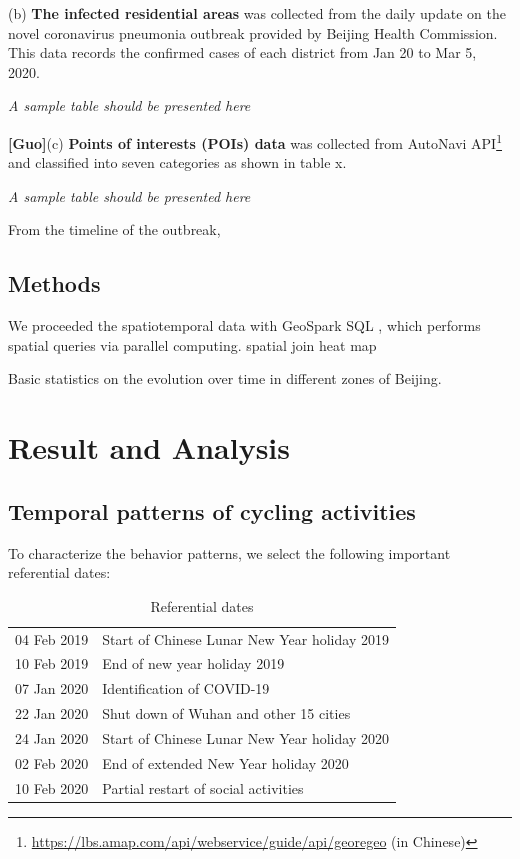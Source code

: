 \documentclass[preprints,ijgi,submit,moreauthors]{Definitions/mdpi}
\begin{document}
(b) \textbf{The infected residential areas} was collected from the daily update on the novel coronavirus pneumonia outbreak provided by Beijing Health Commission. 
This data records the confirmed cases of each district from Jan 20 to Mar 5, 2020. 

{\centering\textit{A sample table should be presented here}

}

\textbf{[Guo]}(c) \textbf{Points of interests (POIs) data} was collected from AutoNavi API\footnote{\url{https://lbs.amap.com/api/webservice/guide/api/georegeo} (in Chinese)} and classified into seven categories as shown in table x. 

{\centering\textit{A sample table should be presented here}

}

From the timeline \cite{li2020early} of the outbreak, 

\subsection{Methods}
We proceeded the spatiotemporal data with GeoSpark SQL \cite{huang2017geospark}, which performs spatial queries via parallel computing.
spatial join 
heat map

Basic statistics on the evolution over time in different zones of Beijing. 

\section{Result and Analysis}
\subsection{Temporal patterns of cycling activities}
To characterize the behavior patterns, we select the following important referential dates: 

\begin{table}[H]
    \centering
    \begin{tabular}{ll}
    04 Feb 2019 & Start of Chinese Lunar New Year holiday 2019 \\
    10 Feb 2019 & End of new year holiday 2019\\
    07 Jan 2020 & Identification of COVID-19\\
    22 Jan 2020 & Shut down of Wuhan and other 15 cities\\
    24 Jan 2020 & Start of Chinese Lunar New Year holiday 2020\\
    02 Feb 2020 & End of extended New Year holiday 2020\\
    10 Feb 2020 & Partial restart of social activities
    \end{tabular}
    \caption{Referential dates}
    \label{tab:my_label}
\end{table}
\end{document}
